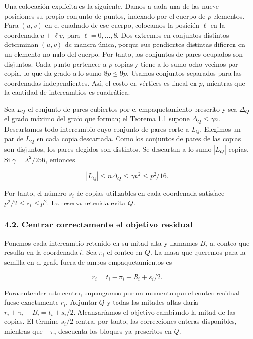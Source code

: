 \documentclass[spanish,11pt,a4paper]{article}
\begin{document}
Una colocación explícita es la siguiente. Damos a cada una de las nueve posiciones su propio conjunto de puntos, indexado por el cuerpo de \(p\) elementos. Para \((u,v)\) en el cuadrado de ese cuerpo, colocamos la posición \(\ell\) en la coordenada \(u+\ell v\), para \(\ell=0,\ldots,8\). Dos extremos en conjuntos distintos determinan \((u,v)\) de manera única, porque sus pendientes distintas difieren en un elemento no nulo del cuerpo. Por tanto, los conjuntos de pares ocupados son disjuntos. Cada punto pertenece a \(p\) copias y tiene a lo sumo ocho vecinos por copia, lo que da grado a lo sumo \(8p\le9p\). Usamos conjuntos separados para las coordenadas independientes. Así, el costo en vértices es lineal en \(p\), mientras que la cantidad de intercambios es cuadrática.

Sea \(L_Q\) el conjunto de pares cubiertos por el empaquetamiento prescrito y sea \(\Delta_Q\) el grado máximo del grafo que forman; el Teorema 1.1 supone \(\Delta_Q\le\gamma n\). Descartamos todo intercambio cuyo conjunto de pares corte a \(L_Q\). Elegimos un par de \(L_Q\) en cada copia descartada. Como los conjuntos de pares de las copias son disjuntos, los pares elegidos son distintos. Se descartan a lo sumo \(|L_Q|\) copias. Si \(\gamma=\lambda^2/256\), entonces

\[|L_Q|\le n\Delta_Q\le\gamma n^2\le p^2/16.\]

Por tanto, el número \(s_i\) de copias utilizables en cada coordenada satisface \(p^2/2\le s_i\le p^2\). La reserva retenida evita \(Q\).

\subsubsection{4.2. Centrar correctamente el objetivo residual}\label{centrar-correctamente-el-objetivo-residual}

Ponemos cada intercambio retenido en su mitad alta y llamamos \(B_i\) al conteo que resulta en la coordenada \(i\). Sea \(\pi_i\) el conteo en \(Q\). La masa que queremos para la semilla en el grafo fuera de ambos empaquetamientos es

\[r_i=t_i-\pi_i-B_i+s_i/2.\tag{4.1}\]

Para entender este centro, supongamos por un momento que el conteo residual fuese exactamente \(r_i\). Adjuntar \(Q\) y todas las mitades altas daría \(r_i+\pi_i+B_i=t_i+s_i/2\). Alcanzaríamos el objetivo cambiando la mitad de las copias. El término \(s_i/2\) centra, por tanto, las correcciones enteras disponibles, mientras que \(-\pi_i\) descuenta los bloques ya prescritos en \(Q\).
\end{document}
